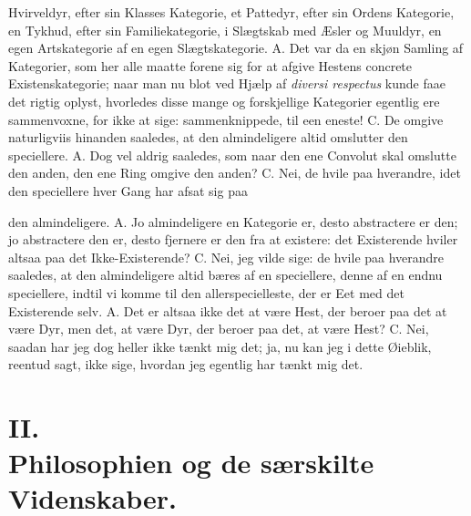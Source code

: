 \documentclass[12pt,a4paper]{book}
\begin{document}
Hvirveldyr, efter sin Klasses Kategorie, et Pattedyr, efter sin Ordens
Kategorie, en Tykhud, efter sin Familiekategorie, i Slægtskab med Æsler
og Muuldyr, en egen Artskategorie af en egen Slægtskategorie. A. Det
var da en skjøn Samling af Kategorier, som her alle maatte forene sig
for at afgive Hestens concrete Existenskategorie; naar man nu blot ved
Hjælp af \textit{diversi respectus} kunde faae det rigtig oplyst,
hvorledes disse mange og forskjellige Kategorier egentlig ere
sammenvoxne, for ikke at sige: sammenknippede, til een eneste! C. De
omgive naturligviis hinanden saaledes, at den almindeligere altid
omslutter den speciellere. A. Dog vel aldrig saaledes, som naar den
ene Convolut skal omslutte den anden, den ene Ring omgive den anden?
C. Nei, de hvile paa hverandre, idet den speciellere hver Gang har
afsat sig paa

den almindeligere. A. Jo almindeligere en Kategorie er, desto
abstractere er den; jo abstractere den er, desto fjernere er den fra at
existere: det Existerende hviler altsaa paa det Ikke-Existerende?
C. Nei, jeg vilde sige: de hvile paa hverandre saaledes, at den
almindeligere altid bæres af en speciellere, denne af en endnu
speciellere, indtil vi komme til den allerspecielleste, der er Eet med
det Existerende selv. A. Det er altsaa ikke det at være Hest, der
beroer paa det at være Dyr, men det, at være Dyr, der beroer paa det,
at være Hest? C. Nei, saadan har jeg dog heller ikke tænkt mig det;
ja, nu kan jeg i dette Øieblik, reentud sagt, ikke sige, hvordan jeg
egentlig har tænkt mig det.


\chapter*{II.\\ Philosophien og de særskilte Videnskaber.}
\end{document}
